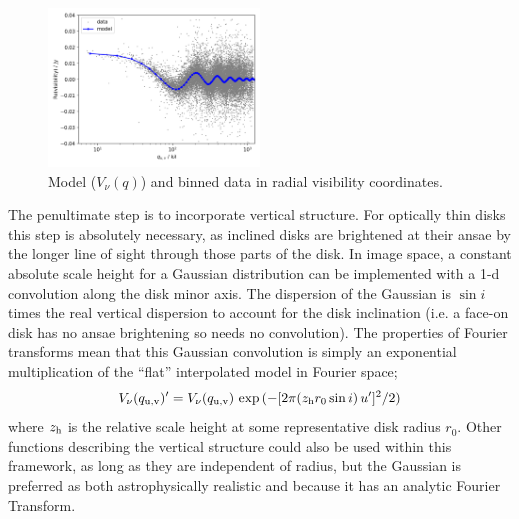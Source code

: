 \documentclass[fleqn,usenatbib]{rasti}
\begin{document}

\begin{figure}
    \centering
    \hspace{-0.5cm}\includegraphics[width=0.5\textwidth]{model.png}
    \caption{Model ($V_\nu(q)$) and binned data in radial visibility coordinates.}
    \label{fig:model}
\end{figure}

The penultimate step is to incorporate vertical structure. For optically thin disks this step is absolutely necessary, as inclined disks are brightened at their ansae by the longer line of sight through those parts of the disk. In image space, a constant absolute scale height for a Gaussian distribution can be implemented with a 1-d convolution along the disk minor axis. The dispersion of the Gaussian is $\sin i$ times the real vertical dispersion to account for the disk inclination (i.e. a face-on disk has no ansae brightening so needs no convolution). The properties of Fourier transforms mean that this Gaussian convolution is simply an exponential multiplication of the ``flat'' interpolated model in Fourier space;
\begin{equation}\label{eq:vert}
    V_\nu(q_{\rm u,v})' = V_\nu(q_{\rm u,v}) \, \exp{(-[2 \pi (z_{\rm h} r_0 \sin i) \, u']^2/2)}
\end{equation}
where $z_{\rm h}$ is the relative scale height at some representative disk radius $r_0$. Other functions describing the vertical structure could also be used within this framework, as long as they are independent of radius, but the Gaussian is preferred as both astrophysically realistic \citep[e.g.][]{2019AJ....157..135M} and because it has an analytic Fourier Transform.
\end{document}

